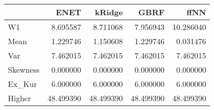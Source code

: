 \begin{tabular}{lrrrr}
\toprule
{} &       ENET &     kRidge &       GBRF &       ffNN \\
\midrule
W1       &   8.695587 &   8.711068 &   7.956943 &  10.286040 \\
Mean     &   1.229746 &   1.150608 &   1.229746 &   0.031476 \\
Var      &   7.462015 &   7.462015 &   7.462015 &   7.462015 \\
Skewness &   0.000000 &   0.000000 &   0.000000 &   0.000000 \\
Ex\_Kur   &   6.000000 &   6.000000 &   6.000000 &   6.000000 \\
Higher   &  48.499390 &  48.499390 &  48.499390 &  48.499390 \\
\bottomrule
\end{tabular}
